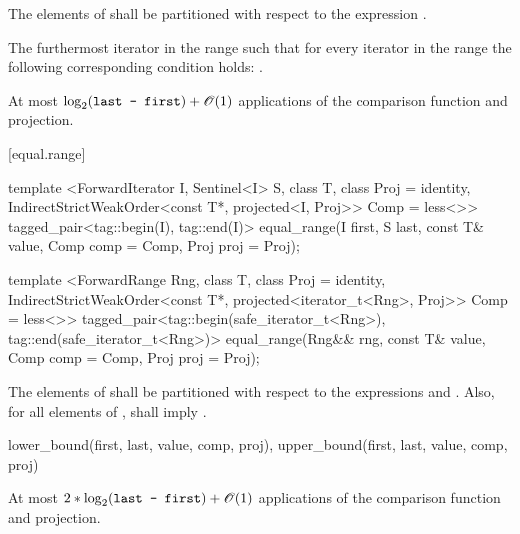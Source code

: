 \begin{itemdescr}
\pnum
\requires
The elements
of
shall be partitioned with respect to the expression
.

\pnum
\returns
The furthermost iterator
in the range
such that for every iterator
in the range
the following corresponding condition holds:
.

\pnum
\complexity
At most
$\log_2(\texttt{last - first}) + \mathscr{O}(1)$
applications of the comparison function and projection.
\end{itemdescr}

[equal.range]{}

%
\begin{itemdecl}
template <ForwardIterator I, Sentinel<I> S, class T, class Proj = identity,
    IndirectStrictWeakOrder<const T*, projected<I, Proj>> Comp = less<>>
  tagged_pair<tag::begin(I), tag::end(I)>
    equal_range(I first, S last, const T& value, Comp comp = Comp{}, Proj proj = Proj{});

template <ForwardRange Rng, class T, class Proj = identity,
    IndirectStrictWeakOrder<const T*, projected<iterator_t<Rng>, Proj>> Comp = less<>>
  tagged_pair<tag::begin(safe_iterator_t<Rng>),
              tag::end(safe_iterator_t<Rng>)>
    equal_range(Rng&& rng, const T& value, Comp comp = Comp{}, Proj proj = Proj{});
\end{itemdecl}

\begin{itemdescr}
\pnum
\requires
The elements
of
shall be partitioned with respect to the expressions
and
.
Also, for all elements
of
\tcode{[first, last)},
shall imply
.

\pnum
\returns
\begin{codeblock}
{lower_bound(first, last, value, comp, proj),
 upper_bound(first, last, value, comp, proj)}
\end{codeblock}

\pnum
\complexity
At most
$2 * \log_2(\texttt{last - first}) + \mathscr{O}(1)$
applications of the comparison function and projection.
\end{itemdescr}

